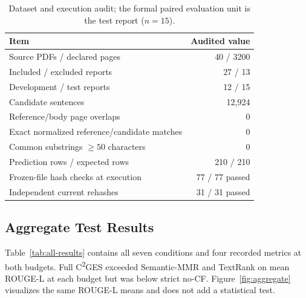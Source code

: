 \documentclass[applsci,article,submit,moreauthors]{Definitions/mdpi}
\newcommand{\cges}{C\textsuperscript{2}GES}
\begin{document}
\begin{table}[H]
\caption{Dataset and execution audit; the formal paired evaluation unit is the test report ($n=15$).}
\label{tab:audit}\centering
\begin{tabular}{lr}
\toprule
Item & Audited value\\
\midrule
Source PDFs / declared pages & 40 / 3200\\
Included / excluded reports & 27 / 13\\
Development / test reports & 12 / 15\\
Candidate sentences & 12,924\\
Reference/body page overlaps & 0\\
Exact normalized reference/candidate matches & 0\\
Common substrings $\geq50$ characters & 0\\
Prediction rows / expected rows & 210 / 210\\
Frozen-file hash checks at execution & 77 / 77 passed\\
Independent current rehashes & 31 / 31 passed\\
\bottomrule
\end{tabular}
\end{table}

\subsection{Aggregate Test Results}

Table~\ref{tab:all-results} contains all seven conditions and four recorded metrics at both budgets. Full \cges{} exceeded Semantic-MMR and TextRank on mean ROUGE-L at each budget but was below strict no-CF. Figure~\ref{fig:aggregate} visualizes the same ROUGE-L means and does not add a statistical test.
\end{document}
